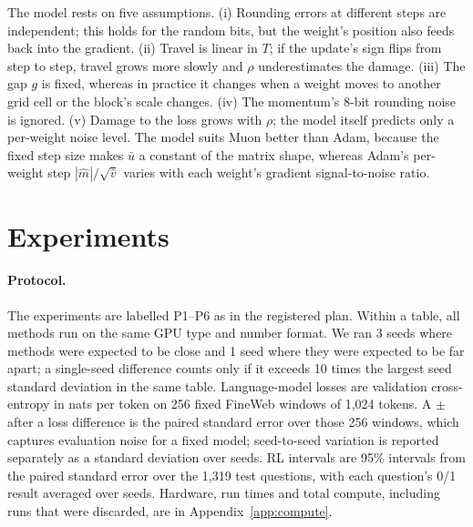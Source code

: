 \documentclass[11pt]{article}
\begin{document}
The model rests on five assumptions. (i) Rounding errors at different steps are independent; this holds for the
random bits, but the weight's position also feeds back into the gradient. (ii) Travel is linear in $T$; if the
update's sign flips from step to step, travel grows more slowly and $\rho$ underestimates the damage. (iii) The gap
$g$ is fixed, whereas in practice it changes when a weight moves to another grid cell or the block's scale changes.
(iv) The momentum's 8-bit rounding noise is ignored. (v) Damage to the loss grows with $\rho$; the model itself
predicts only a per-weight noise level. The model suits Muon better than Adam, because the fixed step size makes
$\bar u$ a constant of the matrix shape, whereas Adam's per-weight step $|\hat m|/\sqrt{\hat v}$ varies with each
weight's gradient signal-to-noise ratio.

\section{Experiments}\label{sec:experiments}

\paragraph{Protocol.} The experiments are labelled P1--P6 as in the registered plan. Within a table, all methods run
on the same GPU type and number format. We ran 3 seeds where methods were expected to be close and 1 seed where they
were expected to be far apart; a single-seed difference counts only if it exceeds 10 times the largest seed standard
deviation in the same table. Language-model losses are validation cross-entropy in nats per token on 256 fixed
FineWeb windows of 1,024 tokens. A $\pm$ after a loss difference is the paired standard error over those 256 windows,
which captures evaluation noise for a fixed model; seed-to-seed variation is reported separately as a standard
deviation over seeds. RL intervals are 95\% intervals from the paired standard error over the 1,319 test questions,
with each question's 0/1 result averaged over seeds. Hardware, run times and total compute, including runs that were
discarded, are in Appendix~\ref{app:compute}.
\end{document}
